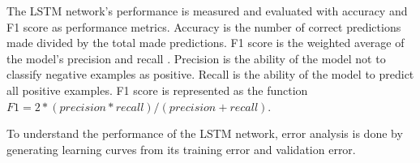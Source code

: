 The LSTM network's performance is measured and evaluated with accuracy and F1 score as performance metrics. Accuracy is the number of correct predictions made divided by the total made predictions. F1 score is the weighted average of the model's precision and recall \citep{scikit-learn}. Precision is the ability of the model not to classify negative examples as positive. Recall is the ability of the model to predict all positive examples. F1 score is represented as the function \(F1 = 2 * (precision * recall) / (precision + recall)\).

To understand the performance of the LSTM network, error analysis is done by generating learning curves from its training error and validation error.